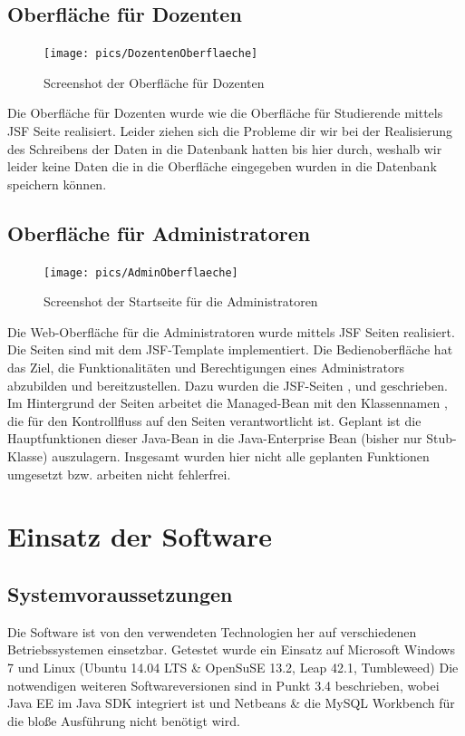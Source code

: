 \documentclass[12pt,a4paper,parskip]{scrreprt}
\begin{document}
\section{Oberfläche für Dozenten}
\begin{figure}[h!]
	\centering
	\texttt{[image: pics/DozentenOberflaeche]}
	\caption[Oberfläche für Dozenten]{Screenshot der Oberfläche für Dozenten}
	\label{fig:DozentenOberfläche}
\end{figure}
Die Oberfläche für Dozenten wurde wie die Oberfläche für Studierende mittels JSF Seite realisiert. Leider ziehen sich die Probleme dir wir bei der Realisierung des Schreibens der Daten in die Datenbank hatten bis hier durch, weshalb wir leider keine Daten die in die Oberfläche eingegeben wurden in die Datenbank speichern können.
\clearpage
\section{Oberfläche für Administratoren}
\begin{figure}[h!]
	\centering
	\texttt{[image: pics/AdminOberflaeche]}
	\caption[Startseite für Administratoren]{Screenshot der Startseite für die Administratoren}
	\label{fig:AdministratorenOberfläche}
\end{figure}
Die Web-Oberfläche für die Administratoren wurde mittels JSF Seiten realisiert. Die Seiten sind mit dem JSF-Template  implementiert. Die Bedienoberfläche hat das Ziel, die Funktionalitäten und Berechtigungen eines Administrators abzubilden und bereitzustellen. Dazu wurden die JSF-Seiten ,  und  geschrieben. Im Hintergrund der Seiten arbeitet die Managed-Bean mit den Klassennamen , die für den Kontrollfluss auf den Seiten verantwortlicht ist. Geplant ist die Hauptfunktionen dieser Java-Bean in die Java-Enterprise Bean  (bisher nur Stub-Klasse) auszulagern. Insgesamt wurden hier nicht alle geplanten Funktionen umgesetzt bzw. arbeiten nicht fehlerfrei.
\clearpage
\chapter{Einsatz der Software}
\section{Systemvoraussetzungen}
Die Software ist von den verwendeten Technologien her auf verschiedenen Betriebssystemen einsetzbar. Getestet wurde ein Einsatz auf Microsoft Windows 7 und Linux (Ubuntu 14.04 LTS \& OpenSuSE 13.2, Leap 42.1, Tumbleweed)
Die notwendigen weiteren Softwareversionen sind in Punkt 3.4 beschrieben, wobei Java EE im Java SDK integriert ist und Netbeans \& die MySQL Workbench für die bloße Ausführung nicht benötigt wird.
\end{document}
